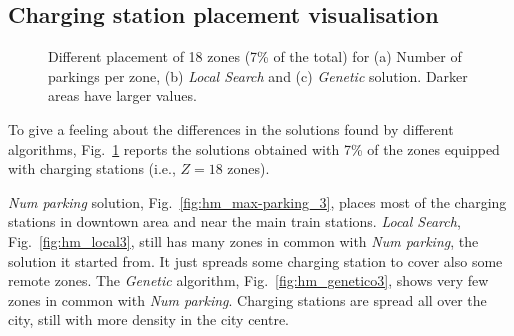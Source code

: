 \subsection{Charging station placement visualisation}

\begin{figure}[h!]
    \centering     %
    \caption{Different placement of 18 zones (7\% of the total) for (a) Number of parkings per zone, (b) \textit{Local Search}  and (c) \textit{Genetic} solution. Darker areas have larger values.}
    \label{fig:maps}
\end{figure}

To give a feeling about the differences in the solutions found by different algorithms, Fig.~\ref{fig:maps} reports the solutions obtained with 7\% of the zones equipped with charging stations (i.e., $Z=18$ zones). %

\textit{Num parking} solution, Fig.~\ref{fig:hm_max-parking_3}, places most of the charging stations in downtown area and near the main train stations. 
\textit{Local Search}, Fig.~\ref{fig:hm_local3}, still has many zones in common with \textit{Num parking}, the solution it started from. It just spreads some charging station to cover also some remote zones.
The \textit{Genetic} algorithm, Fig.~\ref{fig:hm_genetico3}, shows very few zones in common with \textit{Num parking}. Charging stations are spread all over the city, still with more density in the city centre. %
 


